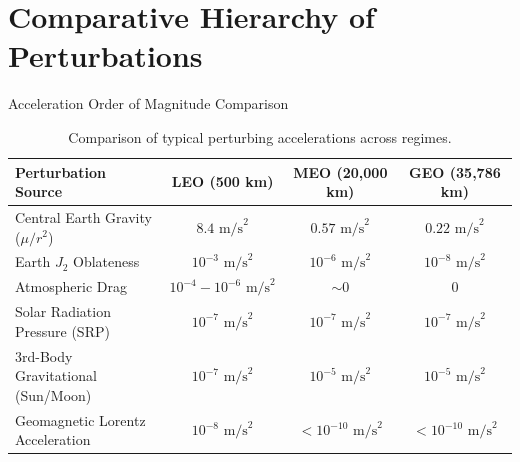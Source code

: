\documentclass[aspectratio=169,11pt]{beamer}
\begin{document}
\section{Comparative Hierarchy of Perturbations}

\begin{frame}{Acceleration Order of Magnitude Comparison}
    \begin{table}
        \centering
        \small
        \begin{tabular}{lccc}
            \toprule
            \textbf{Perturbation Source} & \textbf{LEO (500 km)} & \textbf{MEO (20,000 km)} & \textbf{GEO (35,786 km)} \\
            \midrule
            Central Earth Gravity ($\mu/r^2$) & $8.4 \text{ m/s}^2$ & $0.57 \text{ m/s}^2$ & $0.22 \text{ m/s}^2$ \\
            Earth $J_2$ Oblateness & $10^{-3} \text{ m/s}^2$ & $10^{-6} \text{ m/s}^2$ & $10^{-8} \text{ m/s}^2$ \\
            Atmospheric Drag & $10^{-4} - 10^{-6} \text{ m/s}^2$ & $\sim 0$ & $0$ \\
            Solar Radiation Pressure (SRP) & $10^{-7} \text{ m/s}^2$ & $10^{-7} \text{ m/s}^2$ & $10^{-7} \text{ m/s}^2$ \\
            3rd-Body Gravitational (Sun/Moon) & $10^{-7} \text{ m/s}^2$ & $10^{-5} \text{ m/s}^2$ & $10^{-5} \text{ m/s}^2$ \\
            Geomagnetic Lorentz Acceleration & $10^{-8} \text{ m/s}^2$ & $< 10^{-10} \text{ m/s}^2$ & $< 10^{-10} \text{ m/s}^2$ \\
            \bottomrule
        \end{tabular}
        \caption{Comparison of typical perturbing accelerations across regimes.}
    \end{table}
\end{frame}
\end{document}
